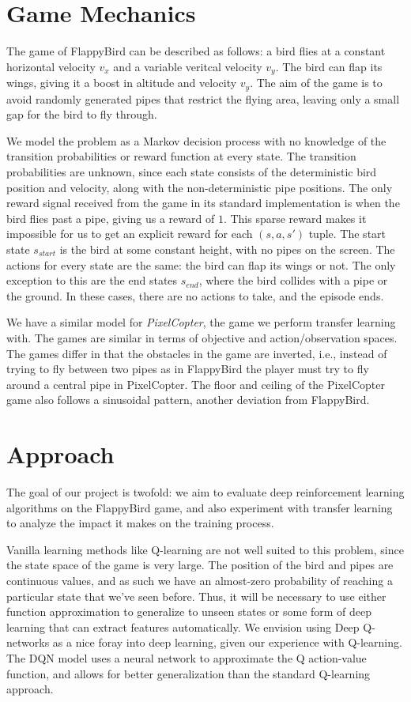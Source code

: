 \documentclass{article}
\begin{document}
\section{Game Mechanics}

The game of FlappyBird can be described as follows: a bird flies at a constant horizontal velocity $v_x$ and a variable veritcal velocity $v_y$. 
The bird can flap its wings, giving it a boost in altitude and velocity $v_y$.
The aim of the game is to avoid randomly generated pipes that restrict the flying area, leaving only a small gap for the bird to fly through. 

We model the problem as a Markov decision process with no knowledge of the transition probabilities or reward function at every state.
The transition probabilities are unknown, since each state consists of the deterministic bird position and velocity, along with the non-deterministic pipe positions.
The only reward signal received from the game in its standard implementation is when the bird flies past a pipe, giving us a reward of $1$. 
This sparse reward makes it impossible for us to get an explicit reward for each $(s, a, s')$ tuple.
The start state $s_{start}$ is the bird at some constant height, with no pipes on the screen.
The actions for every state are the same: the bird can flap its wings or not.
The only exception to this are the end states $s_{end}$, where the bird collides with a pipe or the ground.
In these cases, there are no actions to take, and the episode ends.

We have a similar model for \textit{PixelCopter}, the game we perform transfer learning with. The games are similar in terms of objective and action/observation spaces. 
The games differ in that the obstacles in the game are inverted, i.e., instead of trying to fly between two pipes as in FlappyBird the player must try to fly around a central pipe in PixelCopter.
The floor and ceiling of the PixelCopter game also follows a sinusoidal pattern, another deviation from FlappyBird.


\section{Approach}

The goal of our project is twofold: we aim to evaluate deep reinforcement learning algorithms on the FlappyBird game, and also experiment with transfer learning to analyze the impact it makes on the training process. 

Vanilla learning methods like Q-learning are not well suited to this problem, since the state space of the game is very large. The position of the bird and pipes are continuous values, and as such we have an almost-zero probability of reaching a particular state that we've seen before.
Thus, it will be necessary to use either function approximation to generalize to unseen states or some form of deep learning that can extract features automatically.
We envision using Deep Q-networks as a nice foray into deep learning, given our experience with Q-learning.
The DQN model uses a neural network to approximate the Q action-value function, and allows for better generalization than the standard Q-learning approach.
\end{document}
